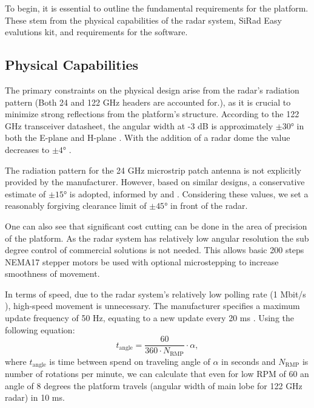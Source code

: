 To begin, it is essential to outline the fundamental requirements for the platform.
These stem from the physical capabilities of the radar system, SiRad Easy evalutions kit, and requirements for the software.

\subsection{Physical Capabilities}


The primary constraints on the physical design arise from the radar's radiation pattern (Both 24 and 122 GHz headers are accounted for.), as it is crucial to minimize strong reflections from the platform's structure. According to the 122 GHz transceiver datasheet, the angular width at -3 dB is approximately $\pm30\text{°}$ in both the E-plane and H-plane \cite{sidarTRX}. With the addition of a radar dome the value decreases to $\pm4\text{°}$ \cite{sidarMAN}.

The radiation pattern for the 24 GHz microstrip patch antenna is not explicitly provided by the manufacturer. However, based on similar designs, a conservative estimate of $\pm15\text{°}$ is adopted, informed by \cite{patch1} and \cite{patch2}. Considering these values, we set a reasonably forgiving clearance limit of $\pm45\text{°}$ in front of the radar.

One can also see that significant cost cutting can be done in the area of precision of the platform.
As the radar system has relatively low angular resolution the sub degree control of commercial solutions is not needed.
This allows basic 200 steps NEMA17 stepper motors be used with optional microstepping to increase smoothness of movement.


In terms of speed, due to the radar system's relatively low polling rate (1 Mbit/s \cite{sidarMAN}), high-speed movement is unnecessary. The manufacturer specifies a maximum update frequency of 50 Hz, equating to a new update every 20 ms \cite{sidarMAN}.
Using the following equation:
%
\begin{equation}
  t_{\mathrm{angle}} = \frac{60}{360\cdot N_{\mathrm{RMP}}} \cdot  \alpha,
  \label{eq:poll}
\end{equation}
%
where $t_{\mathrm{angle}}$ is time between spend on traveling angle of $\alpha $ in seconds and $N_{\mathrm{RMP}}$ is number of rotations per minute, we can calculate that even for low RPM of 60 an angle of 8 degrees the platform travels (angular width of main lobe for 122 GHz radar) in 10 ms.


